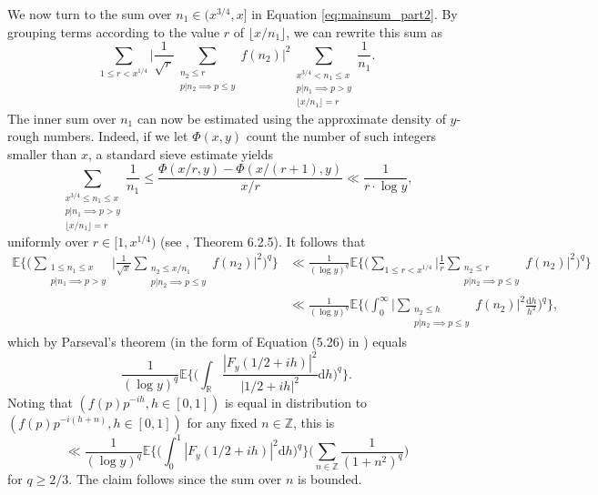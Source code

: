 \documentclass{amsart}
\theoremstyle{definition}
\theoremstyle{remark}
\numberwithin{equation}{section}
\begin{document}
We now turn to the sum over $n_1\in (x^{3/4}, x]$ in Equation \eqref{eq:mainsum_part2}. By grouping terms according to the value $r$ of $\lfloor x/n_1\rfloor$, we can rewrite this sum as 
\[
	\sum_{1\leq r <x^{1/4}} \bigg|\frac{1}{\sqrt{r}}\sum_{\substack{n_2\leq r\\ p|n_2\implies p\leq y}} f(n_2)\bigg|^{2} \sum_{\substack{x^{3/4}< n_1\leq x\\p|n_1\implies p>y\\ \lfloor x/n_1\rfloor = r}} \frac{1}{n_1}.
\]
The inner sum over $n_1$ can now be estimated using the approximate density of $y$-rough numbers. Indeed, if we let $\Phi(x,y)$ count the number of such integers smaller than $x$, a standard sieve estimate yields
\[
	\sum_{\substack{x^{3/4}\leq n_1\leq x\\p|n_1\implies p>y\\ \lfloor x/n_1\rfloor = r}} \frac{1}{n_1} \leq \frac{\Phi(x/r,y)-\Phi(x/(r+1),y)}{x/r} \ll \frac{1}{r\cdot \log y},
\]
uniformly over $r\in [1,x^{1/4})$ (see \cite{CojocaruMurty}, Theorem 6.2.5). It follows that
\begin{align*}
    \mathbb{E}\Bigg\{\Bigg(\sum_{\substack{1\leq n_1\leq x\\p|n_1\implies p>y}} \Bigg|\frac{1}{\sqrt{x}}\sum_{\substack{n_2\leq x/n_1\\ p|n_2\implies p\leq y}} f(n_2)\Bigg|^{2}\Bigg)^q\Bigg\} &\ll \frac{1}{(\log y)^q}\mathbb{E}\Bigg\{\Bigg(\sum_{1\leq r<x^{1/4}} \Bigg|\frac{1}{r}\sum_{\substack{n_2\leq r\\ p|n_2\implies p\leq y}} f(n_2)\Bigg|^{2}\Bigg)^q\Bigg\} \\
    & \ll\frac{1}{(\log y)^q}\mathbb{E}\Bigg\{\Bigg(\int_0^{\infty} \bigg|\sum_{\substack{n_2\leq h\\ p|n_2\implies p\leq y}} f(n_2)\bigg|^{2}\frac{\mathrm{d}h}{h^2}\Bigg)^q\Bigg\},
\end{align*}
which by Parseval's theorem (in the form of Equation (5.26) in \cite{MontgomeryVaughan}) equals
\[
    \frac{1}{(\log y)^q}\mathbb{E}\Bigg\{\Bigg(\int_{\mathbb{R}} \frac{|F_{y}(1/2+ih)|^2}{|1/2+ih|^2}\mathrm{d}h\Bigg)^q\Bigg\}.
\]
Noting that $(f(p)p^{-ih},h\in [0,1])$ is equal in distribution to $(f(p)p^{-i(h+n)},h\in [0,1])$ for any fixed $n\in \mathbb{Z}$, this is
\begin{equation}\label{eq:choppingup}
     \ll \frac{1}{(\log y)^q}\mathbb{E}\bigg\{\bigg(\int_0^{1} {|F_{y}(1/2+ih)|^2}\mathrm{d}h\bigg)^q\bigg\} \bigg(\sum_{n\in \mathbb{Z}}\frac{1}{(1+n^2)^q}\bigg)
\end{equation}
 for $q\geq 2/3$. The claim follows since the sum over $n$ is bounded.
\end{document}
